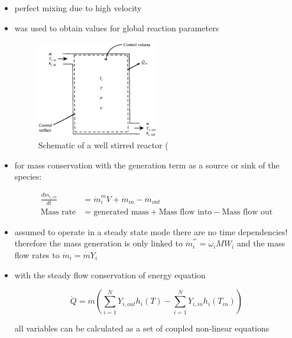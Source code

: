 \documentclass[12pt,oneside,a4paper,english]{article}
\begin{document}
\begin{itemize}
\item{perfect mixing due to high velocity}
\item{was used to obtain values for global reaction parameters}

\begin{figure}[H]
\centering
\includegraphics[width=0.5\textwidth]{Well_Stirred_reactor}
\caption{Schematic of a well stirred reactor (\cite{turns2012introduction}}
\label{fig:well-stirred-reactor}
\end{figure}

\item{for mass conservation with the generation term as a source or sink of the species:}

\begin{align*}
\frac{dm_{i,cv}}{dt} &= \dot{m}_i^m V + \dot{m}_{in} - \dot{m}_{out} \\
\text{Mass rate} &= \text{generated mass} + \text{Mass flow into} - \text{Mass flow out}
\end{align*}

\item {assumed to operate in a steady state mode there are no time dependencies! therefore the mass generation is only linked to $\dot{m}_i^{'''}=\dot{\omega}_i MW_i$ and the mass flow rates to $\dot{m}_i=\dot{m}Y_i$}
\item{with the steady flow conservation of energy equation 

\begin{equation}
\dot{Q}=\dot{m} \left( \sum_{i=1}^N Y_{i,out}h_i(T) - \sum_{i=1}^N Y_{i,in} h_i (T_{in}) \right)
\end{equation}

all variables can be calculated as a set of coupled non-linear equations}

\end{itemize}
\end{document}
